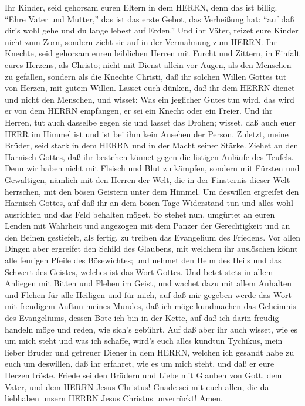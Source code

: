  Ihr Kinder, seid gehorsam euren Eltern in dem HERRN, denn
das ist billig.  ``Ehre Vater und Mutter,'' das ist das
erste Gebot, das Verheißung hat:  ``auf daß dir's wohl gehe
und du lange lebest auf Erden.''  Und ihr Väter, reizet eure
Kinder nicht zum Zorn, sondern zieht sie auf in der Vermahnung zum
HERRN.  Ihr Knechte, seid gehorsam euren leiblichen Herren
mit Furcht und Zittern, in Einfalt eures Herzens, als Christo;
 nicht mit Dienst allein vor Augen, als den Menschen zu
gefallen, sondern als die Knechte Christi, daß ihr solchen Willen Gottes
tut von Herzen, mit gutem Willen.  Lasset euch dünken, daß
ihr dem HERRN dienet und nicht den Menschen,  und wisset:
Was ein jeglicher Gutes tun wird, das wird er von dem HERRN empfangen,
er sei ein Knecht oder ein Freier.  Und ihr Herren, tut auch
dasselbe gegen sie und lasset das Drohen; wisset, daß auch euer HERR im
Himmel ist und ist bei ihm kein Ansehen der Person. 
Zuletzt, meine Brüder, seid stark in dem HERRN und in der Macht seiner
Stärke.  Ziehet an den Harnisch Gottes, daß ihr bestehen
könnet gegen die listigen Anläufe des Teufels.  Denn wir
haben nicht mit Fleisch und Blut zu kämpfen, sondern mit Fürsten und
Gewaltigen, nämlich mit den Herren der Welt, die in der Finsternis
dieser Welt herrschen, mit den bösen Geistern unter dem Himmel.
 Um deswillen ergreifet den Harnisch Gottes, auf daß ihr an
dem bösen Tage Widerstand tun und alles wohl ausrichten und das Feld
behalten möget.  So stehet nun, umgürtet an euren Lenden
mit Wahrheit und angezogen mit dem Panzer der Gerechtigkeit
 und an den Beinen gestiefelt, als fertig, zu treiben das
Evangelium des Friedens.  Vor allen Dingen aber ergreifet
den Schild des Glaubens, mit welchem ihr auslöschen könnt alle feurigen
Pfeile des Bösewichtes;  und nehmet den Helm des Heils und
das Schwert des Geistes, welches ist das Wort Gottes.  Und
betet stets in allem Anliegen mit Bitten und Flehen im Geist, und wachet
dazu mit allem Anhalten und Flehen für alle Heiligen  und
für mich, auf daß mir gegeben werde das Wort mit freudigem Auftun meines
Mundes, daß ich möge kundmachen das Geheimnis des Evangeliums,
 dessen Bote ich bin in der Kette, auf daß ich darin
freudig handeln möge und reden, wie sich's gebührt.  Auf
daß aber ihr auch wisset, wie es um mich steht und was ich schaffe,
wird's euch alles kundtun Tychikus, mein lieber Bruder und getreuer
Diener in dem HERRN,  welchen ich gesandt habe zu euch um
deswillen, daß ihr erfahret, wie es um mich steht, und daß er eure
Herzen tröste.  Friede sei den Brüdern und Liebe mit
Glauben von Gott, dem Vater, und dem HERRN Jesus Christus! 
Gnade sei mit euch allen, die da liebhaben unsern HERRN Jesus Christus
unverrückt! Amen.
